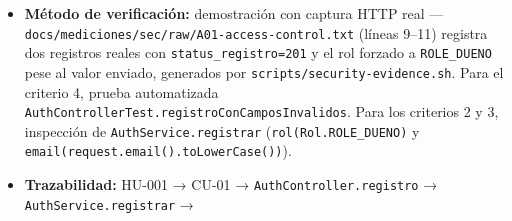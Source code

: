 \documentclass[
  spanish,
]{article}
\providecommand{\tightlist}{%
  \setlength{\itemsep}{0pt}\setlength{\parskip}{0pt}}
\begin{document}
\begin{itemize}
  \begin{enumerate}
  \def\labelenumi{\arabic{enumi}.}
  \tightlist
  \item
    Dado un visitante no autenticado, cuando envía
    \texttt{POST\ /\allowbreak{}api/\allowbreak{}auth/\allowbreak{}registro} con nombre, correo no registrado y
    contraseña válidos, entonces la respuesta es \texttt{201\ Created} y
    el cuerpo contiene \texttt{id}, \texttt{nombre}, \texttt{email} y
    \texttt{rol}, sin ningún campo de contraseña ni hash.
  \item
    Dado un cuerpo de registro que incluye \texttt{"rol":"ROLE\_\allowbreak{}ADMIN"}
    (o cualquier otro rol), cuando se procesa el registro, entonces el
    usuario creado queda con \texttt{rol\ =\ ROLE\_\allowbreak{}DUENO} y
    \texttt{activo\ =\ true}.
  \item
    Dado un correo con mayúsculas, cuando se registra, entonces el
    correo se persiste en minúsculas.
  \item
    Dado un cuerpo con nombre vacío, correo con formato inválido o
    contraseña de menos de 8 caracteres, cuando se envía la solicitud,
    entonces la respuesta es \texttt{422\ Unprocessable\ E\allowbreak{}ntity} con
    \texttt{Problem\allowbreak{}Detail} de tipo \texttt{urn:biopet:error:\allowbreak{}validation}
    y el objeto \texttt{errors} enumera los campos inválidos.
  \end{enumerate}
\item
  \textbf{Método de verificación:} demostración con captura HTTP real
  --- \texttt{docs/\allowbreak{}mediciones/\allowbreak{}sec/\allowbreak{}raw/\allowbreak{}A01-\allowbreak{}access-\allowbreak{}control.\allowbreak{}txt} (líneas
  9--11) registra dos registros reales con \texttt{status\_\allowbreak{}registro=2\allowbreak{}01}
  y el rol forzado a \texttt{ROLE\_\allowbreak{}DUENO} pese al valor enviado,
  generados por \texttt{scripts/\allowbreak{}security-\allowbreak{}evidence.\allowbreak{}sh}. Para el criterio
  4, prueba automatizada
  \texttt{Auth\allowbreak{}Controller\allowbreak{}Test.\allowbreak{}registro\allowbreak{}Con\allowbreak{}Campos\allowbreak{}Invalidos}. Para los
  criterios 2 y 3, inspección de \texttt{Auth\allowbreak{}Service.\allowbreak{}registrar}
  (\texttt{rol(Rol.\allowbreak{}ROLE\_\allowbreak{}DUENO)} y
  \texttt{email(request.\allowbreak{}email().\allowbreak{}to\allowbreak{}Lower\allowbreak{}Case())}).
\item
  \textbf{Trazabilidad:} HU-001 → CU-01 →
  \texttt{Auth\allowbreak{}Controller.\allowbreak{}registro} → \texttt{Auth\allowbreak{}Service.\allowbreak{}registrar} →

\end{itemize}
\end{document}
